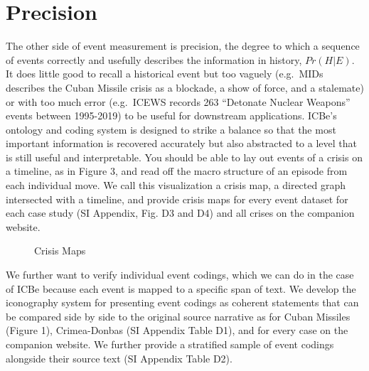 \documentclass{article}
\begin{document}
\hypertarget{precision}{%
\section*{Precision}\label{precision}}

The other side of event measurement is precision, the degree to which a
sequence of events correctly and usefully describes the information in
history, \(Pr(H|E)\). It does little good to recall a historical event
but too vaguely (e.g.~MIDs describes the Cuban Missile crisis as a
blockade, a show of force, and a stalemate) or with too much error
(e.g.~ICEWS records 263 ``Detonate Nuclear Weapons'' events between
1995-2019) to be useful for downstream applications. ICBe's ontology and
coding system is designed to strike a balance so that the most important
information is recovered accurately but also abstracted to a level that
is still useful and interpretable. You should be able to lay out events
of a crisis on a timeline, as in Figure 3, and read off the macro
structure of an episode from each individual move. We call this
visualization a crisis map, a directed graph intersected with a
timeline, and provide crisis maps for every event dataset for each case
study (SI Appendix, Fig. D3 and D4) and all crises on the companion
website.

\clearpage
\onecolumn
\begin{figure}
\caption{Crisis Maps  \label{fig:p_precision_combined}}
\end{figure}
\clearpage
\twocolumn

We further want to verify individual event codings, which we can do in
the case of ICBe because each event is mapped to a specific span of
text. We develop the iconography system for presenting event codings as
coherent statements that can be compared side by side to the original
source narrative as for Cuban Missiles (Figure 1), Crimea-Donbas (SI
Appendix Table D1), and for every case on the companion website. We
further provide a stratified sample of event codings alongside their
source text (SI Appendix Table D2).
\end{document}
